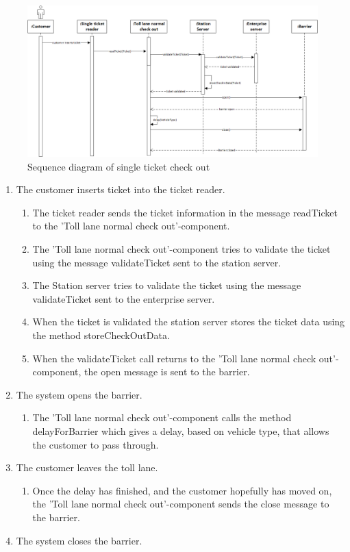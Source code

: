 \documentclass[11pt]{article}
\begin{document}
\begin{figure}[h]
\centering
\includegraphics[width=0.7\linewidth]{../report/img/sequence_diagrams/sequence_diagram_single_ticket_check_out.png}
\caption[fig1]{Sequence diagram of single ticket check out}
\label{fig1}
\end{figure}

\begin{enumerate}
\item The customer inserts ticket into the ticket reader.
\begin{enumerate}
\item The ticket reader sends the ticket information in the message readTicket to the 'Toll lane normal check out'-component.
\item The 'Toll lane normal check out'-component tries to validate the ticket using the message validateTicket sent to the station server.
\item The Station server tries to validate the ticket using the message validateTicket sent to the enterprise server.
\item When the ticket is validated the station server stores the ticket data using the method storeCheckOutData.
\item When the validateTicket call returns to the 'Toll lane normal check out'-component, the open message is sent to the barrier.
\end{enumerate}
\item The system opens the  barrier.
\begin{enumerate}
\item The 'Toll lane normal check out'-component calls the method delayForBarrier which gives a delay, based on vehicle type, that allows the customer to pass through.
\end{enumerate}
\item The customer leaves the toll lane.
\begin{enumerate}
\item Once the delay has finished, and the customer hopefully has moved on, the 'Toll lane normal check out'-component sends the close message to the barrier.
\end{enumerate}
\item The system closes the barrier.

\end{enumerate}
\end{document}
